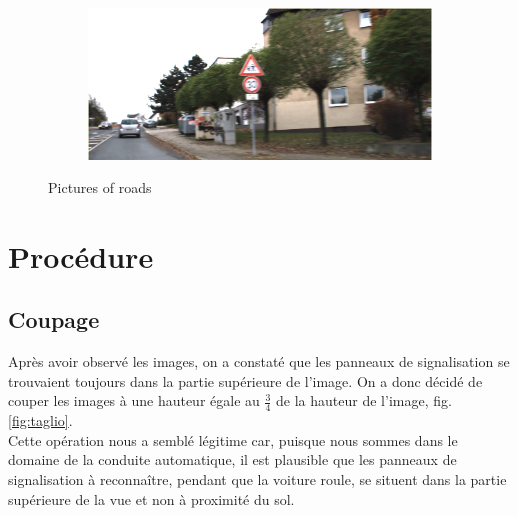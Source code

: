 \documentclass[11pt, french]{article}
\begin{document}
\begin{figure}[h]
\begin{subfigure}[b]{0.4\textwidth}
        \caption{}
        \label{fig:11}
    \end{subfigure}
     \begin{subfigure}[b]{0.4\textwidth}
        \includegraphics[width=\textwidth]{30.png}
        \caption{}
        \label{fig:30}
    \end{subfigure}
    \caption{Pictures of roads}\label{fig:roads}
\end{figure}

\section{Procédure}
\subsection{Coupage }
Après avoir observé les images, on a constaté que les panneaux de signalisation se trouvaient toujours dans la partie supérieure de l’image. On a donc décidé de couper les images à une hauteur égale au $\frac{3}{4}$ de la hauteur de l’image, fig.\ref{fig:taglio}.\\
Cette opération nous a semblé légitime car, puisque nous sommes dans le domaine de la conduite automatique, il est plausible que les panneaux de signalisation à reconnaître, pendant que la voiture roule, se situent dans la partie supérieure de la vue et non à proximité du sol.\\
\end{document}
